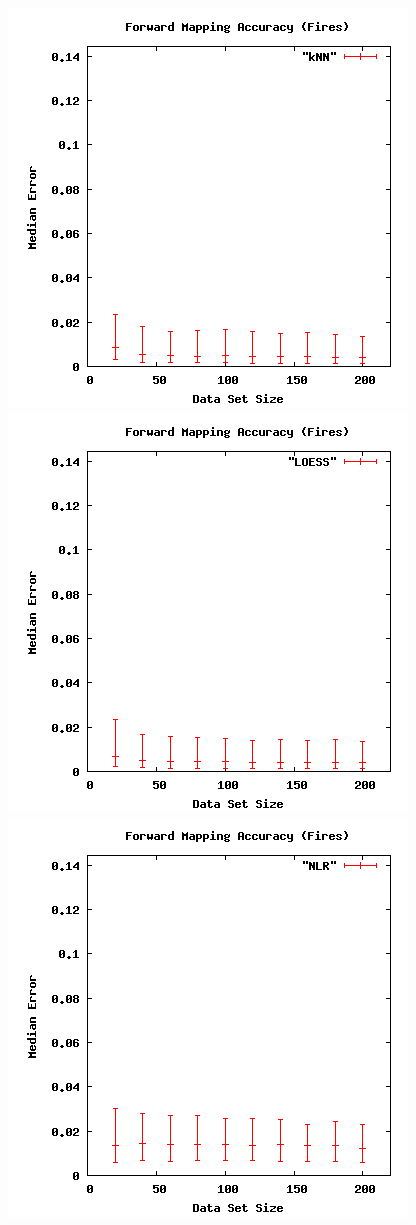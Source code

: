 \begin{figure}[ht]
\centering
\includegraphics[scale=.3333333]{images/results_fires/fmacc-kNN.png}
\includegraphics[scale=.3333333]{images/results_fires/fmacc-LOESS.png}
\includegraphics[scale=.3333333]{images/results_fires/fmacc-NLR.png}

\end{figure}
